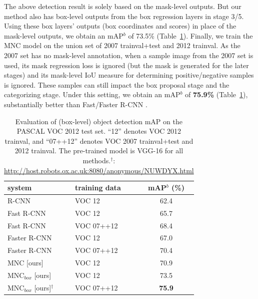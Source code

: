 \documentclass[10pt,twocolumn,letterpaper]{article}
\begin{document}
The above detection result is solely based on the mask-level outputs. But our method also has box-level outputs from the box regression layers in stage 3/5. Using these box layers' outputs (box coordinates and scores) in place of the mask-level outputs, we obtain an mAP$^b$ of 73.5\% (Table~\ref{tab:det_result}).
Finally, we train the MNC model on the union set of 2007 trainval+test and 2012 trainval. As the 2007 set has no mask-level annotation, when a sample image from the 2007 set is used, its mask regression loss is ignored (but the mask is generated for the later stages) and its mask-level IoU measure for determining positive/negative samples is ignored. These samples can still impact the box proposal stage and the categorizing stage. Under this setting, we obtain an mAP$^b$ of \textbf{75.9\%} (Table~\ref{tab:det_result}), substantially better than Fast/Faster R-CNN \cite{Girshick2015,Ren2015}.

\setlength{\tabcolsep}{8pt}
\renewcommand{\arraystretch}{1.05}
\begin{table}[t]
\begin{center}
\small
\begin{tabular}{l|l|c}
system & training data & mAP$^{b}$ (\%) \\
\hline
R-CNN \cite{Girshick2014} & VOC 12 & 62.4 \\
Fast R-CNN \cite{Girshick2015} & VOC 12 &  65.7 \\
Fast R-CNN \cite{Girshick2015} & VOC 07++12 &  68.4 \\
Faster R-CNN \cite{Ren2015} & VOC 12 & 67.0 \\
Faster R-CNN \cite{Ren2015} & VOC 07++12 & 70.4 \\
\hline
MNC [ours] & VOC 12 & 70.9 \\
MNC$_{box}$ [ours] & VOC 12 & 73.5 \\
MNC$_{box}$ [ours]$^\dag$ & VOC 07++12 & \textbf{75.9} \\
\end{tabular}
\end{center}
\vspace{-.5em}
\caption{Evaluation of (box-level) object detection mAP on the PASCAL VOC 2012 test set. ``12'' denotes VOC 2012 trainval, and ``07++12'' denotes VOC 2007 trainval+test and 2012 trainval. The pre-trained model is VGG-16 for all methods.$^\dag$: \url{http://host.robots.ox.ac.uk:8080/anonymous/NUWDYX.html}}
\label{tab:det_result}
\end{table}
\end{document}
